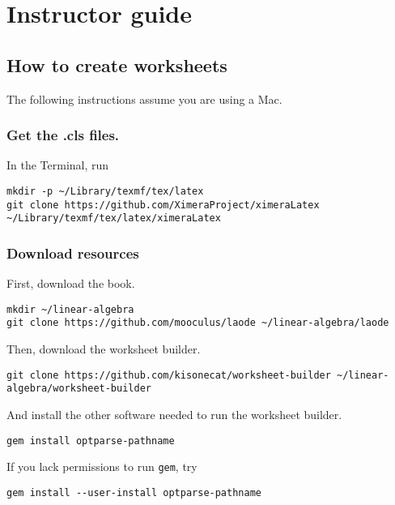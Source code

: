 \documentclass{article}
\begin{document}
\section{Instructor guide}\label{instructor-guide}

\subsection{How to create worksheets}\label{how-to-create-worksheets}

The following instructions assume you are using a Mac.

\subsubsection{Get the .cls files.}\label{get-the-.cls-files.}

In the Terminal, run

\begin{verbatim}
mkdir -p ~/Library/texmf/tex/latex
git clone https://github.com/XimeraProject/ximeraLatex ~/Library/texmf/tex/latex/ximeraLatex
\end{verbatim}

\subsubsection{Download resources}\label{download-resources}

First, download the book.

\begin{verbatim}
mkdir ~/linear-algebra
git clone https://github.com/mooculus/laode ~/linear-algebra/laode
\end{verbatim}

Then, download the worksheet builder.

\begin{verbatim}
git clone https://github.com/kisonecat/worksheet-builder ~/linear-algebra/worksheet-builder
\end{verbatim}

And install the other software needed to run the worksheet builder.

\begin{verbatim}
gem install optparse-pathname
\end{verbatim}

If you lack permissions to run \texttt{gem}, try

\begin{verbatim}
gem install --user-install optparse-pathname
\end{verbatim}
\end{document}
